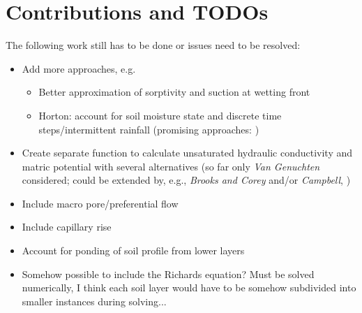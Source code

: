 \section{Contributions and TODOs}
The following work still has to be done or issues need to be resolved:

\begin{itemize}
\item Add more approaches, e.g.
  \begin{itemize}
    \item Better approximation of sorptivity and suction at wetting front \citep{Stewart2013}
    \item Horton: account for soil moisture state and discrete time steps/intermittent rainfall (promising approaches: \citet{Ludwig2010en,Bauer1974,Green1986,Rossman2016})
  \end{itemize}
\item Create separate function to calculate unsaturated hydraulic conductivity and matric potential with several alternatives (so far only \emph{Van Genuchten} considered; could be extended by, e.g., \emph{Brooks and Corey} and/or \emph{Campbell}, \citet{Maidment1993})
\item Include macro pore/preferential flow
\item Include capillary rise
\item Account for ponding of soil profile from lower layers
\item Somehow possible to include the Richards equation? Must be solved numerically, I think each soil layer would have to be somehow subdivided into smaller instances during solving...
\end{itemize}
